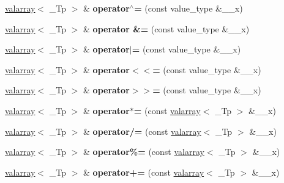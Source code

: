 \begin{DoxyCompactItemize}
\hyperlink{classvalarray}{valarray}$<$ \+\_\+\+Tp $>$ \& {\bfseries operator$^\wedge$=} (const value\+\_\+type \&\+\_\+\+\_\+x)
\item 
\mbox{\label{classvalarray_a0f5a704605095c552036628d57cc9748}} 
\hyperlink{classvalarray}{valarray}$<$ \+\_\+\+Tp $>$ \& {\bfseries operator \&=} (const value\+\_\+type \&\+\_\+\+\_\+x)
\item 
\mbox{\label{classvalarray_a039ec4b7fa029b8410e9384fc96295e5}} 
\hyperlink{classvalarray}{valarray}$<$ \+\_\+\+Tp $>$ \& {\bfseries operator$\vert$=} (const value\+\_\+type \&\+\_\+\+\_\+x)
\item 
\mbox{\label{classvalarray_a7c55a7cbaa12c7cfbd77b2c5e20c21d0}} 
\hyperlink{classvalarray}{valarray}$<$ \+\_\+\+Tp $>$ \& {\bfseries operator$<$$<$=} (const value\+\_\+type \&\+\_\+\+\_\+x)
\item 
\mbox{\label{classvalarray_a8deffabb8e751871ec3c46e10167c6d4}} 
\hyperlink{classvalarray}{valarray}$<$ \+\_\+\+Tp $>$ \& {\bfseries operator$>$$>$=} (const value\+\_\+type \&\+\_\+\+\_\+x)
\item 
\mbox{\label{classvalarray_a5bd8de7bef9aed4623774923e03f572b}} 
\hyperlink{classvalarray}{valarray}$<$ \+\_\+\+Tp $>$ \& {\bfseries operator$\ast$=} (const \hyperlink{classvalarray}{valarray}$<$ \+\_\+\+Tp $>$ \&\+\_\+\+\_\+x)
\item 
\mbox{\label{classvalarray_aa56bea34e4c9db5bd940ed51065da695}} 
\hyperlink{classvalarray}{valarray}$<$ \+\_\+\+Tp $>$ \& {\bfseries operator/=} (const \hyperlink{classvalarray}{valarray}$<$ \+\_\+\+Tp $>$ \&\+\_\+\+\_\+x)
\item 
\mbox{\label{classvalarray_ac2d217cfcec3857de11a185f28df7afc}} 
\hyperlink{classvalarray}{valarray}$<$ \+\_\+\+Tp $>$ \& {\bfseries operator\%=} (const \hyperlink{classvalarray}{valarray}$<$ \+\_\+\+Tp $>$ \&\+\_\+\+\_\+x)
\item 
\mbox{\label{classvalarray_a456b9ee91e674ea02d89f006b523680e}} 
\hyperlink{classvalarray}{valarray}$<$ \+\_\+\+Tp $>$ \& {\bfseries operator+=} (const \hyperlink{classvalarray}{valarray}$<$ \+\_\+\+Tp $>$ \&\+\_\+\+\_\+x)

\end{DoxyCompactItemize}

